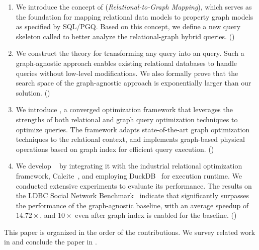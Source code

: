\begin{enumerate}
\item We introduce the concept of \rgmapping (\emph{Relational-to-Graph Mapping}), which serves as the foundation for mapping relational data models to property graph models as specified by SQL/PGQ. Based on this concept, we define a new query skeleton called \spjm to better analyze the relational-graph hybrid queries. \hfill()

\item We construct the theory for transforming any \spjm query into an \spj query. Such a graph-agnostic approach enables existing relational databases to handle \spjm queries without low-level modifications. We also formally prove that the search space
of the graph-agnostic approach is exponentially larger than our solution. \hfill()

\item We introduce \name, a converged optimization framework that leverages the strengths of both relational and graph query optimization techniques to optimize \spjm queries. The framework adapts state-of-the-art graph optimization techniques to the relational context, and implements graph-based physical operations based on graph index for efficient query execution. \hfill()

\item We develop \name~ by integrating it with the industrial relational optimization framework, Calcite~\cite{calcite}, and employing DuckDB~\cite{duckdb} for execution runtime. We conducted extensive experiments to evaluate its performance. The results on the LDBC Social Network Benchmark~\cite{ldbc_snb} indicate that \name significantly surpasses the performance of the graph-agnostic baseline, with an average speedup of $14.72\times$, and $10\times$ even after graph index is enabled for the baseline. \hfill()

\end{enumerate}

This paper is organized in the order of the contributions. We survey related work in 
and conclude the paper in .

